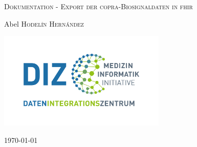 \begin{titlepage}
	\thispagestyle{firstpage}
	
	\centering
	{\scshape\LARGE Dokumentation - Export der \acs{copra}-Biosignaldaten in \acs{fhir} \par} 
	\vspace{1.5cm}
		\vspace{2cm}
	{\Large Abel \textsc{Hodelín Hernández}\par} 
	\vspace{2cm}
	\includegraphics[width=8cm]{figures/diz}
	\vfill
	{\large \today\par}
	
\end{titlepage}